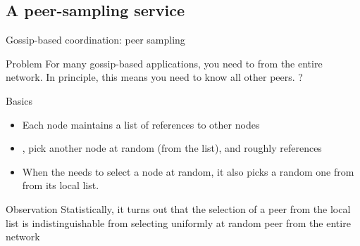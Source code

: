 \subsection{A peer-sampling service}
\begin{frame}{Gossip-based coordination: peer sampling}
  \begin{block}{Problem}
    For many gossip-based applications, you need to  from the entire
    network. In principle, this means you need to know all other peers. ?
  \end{block}
  \begin{block}{Basics}
    \begin{itemize}
      \item Each node maintains a list of  references to other nodes
      \item {}, pick another node at random (from the list), and  roughly
             references
      \item When the  needs to select a node at random, it also picks a random one from from
            its local list.
    \end{itemize}
  \end{block}
  \begin{alertblock}{Observation}
    Statistically, it turns out that the selection of a peer from the local list is indistinguishable from
    selecting uniformly at random peer from the entire network
  \end{alertblock}
\end{frame}
